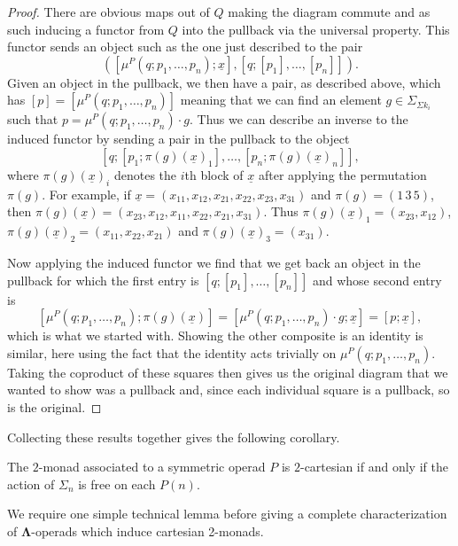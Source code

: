 \documentclass{amsbook} %
\newcommand{\ML}{\mathbf{\Lambda}}
\numberwithin{section}{chapter}
\begin{document}
\begin{proof}
There are obvious maps out of $Q$ making the diagram commute and as such inducing a functor from $Q$ into the pullback via the universal property. This functor sends an object such as the one just described to the pair
    \[
        \left([\mu^P(q;p_1,\ldots,p_n);\underline{x}], [q;[p_1],\ldots,[p_n]]\right).
    \]
Given an object in the pullback, we then have a pair, as described above, which has $[p] = [\mu^P(q;p_1,\ldots,p_n)]$ meaning that we can find an element $g \in \Sigma_{\Sigma k_i}$ such that $p  = \mu^P(q;p_1,\ldots,p_n) \cdot g$. Thus we can describe an inverse to the induced functor by sending a pair in the pullback to the object
    \[
        [q;[p_1;\pi(g)(\underline{x})_1],\ldots,[p_n;\pi(g)(\underline{x})_n]],
    \]
where $\pi(g)(\underline{x})_i$ denotes the $i$th block of $\underline{x}$ after applying the permutation $\pi(g)$. For example, if $\underline{x} = (x_{11}, x_{12}, x_{21}, x_{22}, x_{23}, x_{31})$ and $\pi(g) = (1\, 3\, 5)$, then $\pi(g)(\underline{x}) = (x_{23}, x_{12}, x_{11}, x_{22}, x_{21}, x_{31})$. Thus $\pi(g)(\underline{x})_1 = (x_{23}, x_{12})$, $\pi(g)(\underline{x})_2 = (x_{11}, x_{22}, x_{21})$ and $\pi(g)(\underline{x})_3 = (x_{31})$.

Now applying the induced functor we find that we get back an object in the pullback for which the first entry is $[q;[p_1],\ldots,[p_n]]$ and whose second entry is
    \[
       [\mu^P(q;p_1,\ldots,p_n);\pi(g)(\underline{x})] = [\mu^P(q;p_1,\ldots,p_n) \cdot g;\underline{x}] = [p;\underline{x}],
    \]
which is what we started with. Showing the other composite is an identity is similar, here using the fact that the identity acts trivially on $\mu^P(q;p_1,\ldots,p_n)$. Taking the coproduct of these squares then gives us the original diagram that we wanted to show was a pullback and, since each individual square is a pullback, so is the original.
\end{proof}

Collecting these results together gives the following corollary.

\begin{cor}\label{cart_cor}
The $2$-monad associated to a symmetric operad $P$ is $2$-cartesian if and only if the action of $\Sigma_n$ is free on each $P(n)$.
\end{cor}

We require one simple technical lemma before giving a complete characterization of $\ML$-operads which induce cartesian 2-monads.
\end{document}
